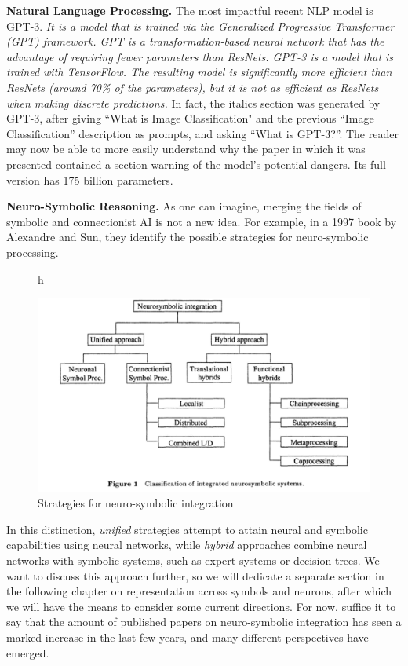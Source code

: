 \documentclass[../main.tex]{subfiles}
\begin{document}
\vspace{4pt}
\textbf{Natural Language Processing.} The most impactful recent NLP model is GPT-3. \textit{It is a model that is trained via the Generalized Progressive Transformer (GPT) framework. GPT is a transformation-based neural network that has the advantage of requiring fewer parameters than ResNets. GPT-3 is a model that is trained with TensorFlow. The resulting model is significantly more efficient than ResNets (around 70\% of the parameters), but it is not as efficient as ResNets when making discrete predictions.} In fact, the italics section was generated by GPT-3, after giving ``What is Image Classification" and the previous ``Image Classification'' description as prompts, and asking ``What is GPT-3?''. The reader may now be able to more easily understand why the paper in which it was presented contained a section warning of the model's potential dangers\cite{brownLanguageModelsAre2020}. Its full version has 175 billion parameters.

\vspace{4pt}
\textbf{Neuro-Symbolic Reasoning.} As one can imagine, merging the fields of symbolic and connectionist AI is not a new idea. For example, in a 1997 book by Alexandre and Sun\cite{alexandreConnectionistSymbolicIntegrationUnified1997}, they identify the possible strategies for neuro-symbolic processing.
\begin{figure}{h}
    \centering
    \caption{Strategies for neuro-symbolic integration\cite{alexandreConnectionistSymbolicIntegrationUnified1997} }
    \includegraphics[width=\textwidth]{img/hybrid.png}
\end{figure}
In this distinction, \textit{unified} strategies attempt to attain neural and symbolic capabilities using neural networks, while \textit{hybrid} approaches combine neural networks with symbolic systems, such as expert systems or decision trees. We want to discuss this approach further, so we will dedicate a separate section in the following chapter on representation across symbols and neurons, after which we will have the means to consider some current directions. For now, suffice it to say that the amount of published papers on neuro-symbolic integration has seen a marked increase in the last few years, and many different perspectives have emerged.
\end{document}
